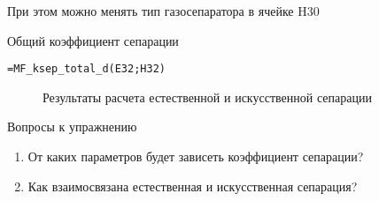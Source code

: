 При этом можно менять тип газосепаратора в ячейке H30

Общий коэффициент сепарации

{ \small  \texttt{=MF\_ksep\_total\_d(E32;H32)
}}

\begin{figure}[h!]
	\center{\texttt{[image: Ex60\_2]}}
	\caption{Результаты расчета естественной и искусственной сепарации}
	\label{ris:Ex60_2}
\end{figure}

Вопросы к упражнению

\begin{enumerate}
	\item От каких параметров будет зависеть коэффициент сепарации?
	\item Как взаимосвязана естественная и искусственная сепарация? 
\end{enumerate}
